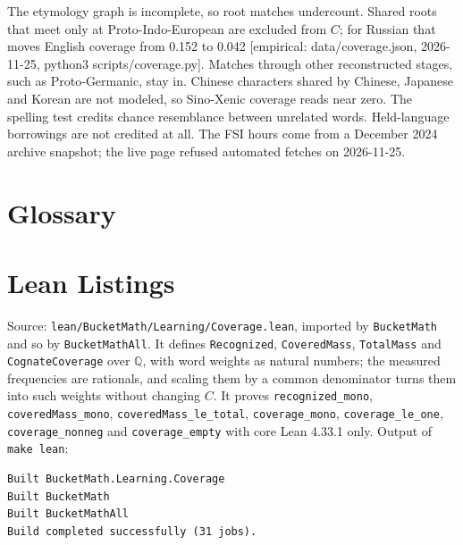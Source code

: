 \documentclass[11pt]{article}
\newcommand{\emp}[1]{{\small[empirical: #1]}}
\newcommand{\covrun}{data/coverage.json, 2026-11-25, python3 scripts/coverage.py}
\begin{document}
The etymology graph is incomplete, so root matches undercount. Shared
roots that meet only at Proto-Indo-European are excluded from $C$; for
Russian that moves English coverage from 0.152 to 0.042 \emp{\covrun}.
Matches through other reconstructed stages, such as Proto-Germanic, stay
in. Chinese
characters shared by Chinese, Japanese and Korean are not modeled, so
Sino-Xenic coverage reads near zero. The spelling test credits chance
resemblance between unrelated words. Held-language borrowings are not
credited at all. The FSI hours come from a December 2024
archive snapshot; the live page refused automated fetches on 2026-11-25.

\printbibliography

\appendix

\section{Glossary}
\label{app:glossary}


\section{Lean Listings}
\label{app:lean}

Source: \texttt{lean/BucketMath/Learning/Coverage.lean}, imported by
\texttt{BucketMath} and so by \texttt{BucketMathAll}. It defines
\texttt{Recognized}, \texttt{CoveredMass}, \texttt{TotalMass} and
\texttt{CognateCoverage} over $\mathbb{Q}$, with word weights as natural
numbers; the measured frequencies are rationals, and scaling them by a
common denominator turns them into such weights without changing $C$. It proves
\texttt{recognized\_mono}, \texttt{coveredMass\_mono},
\texttt{coveredMass\_le\_total}, \texttt{coverage\_mono},
\texttt{coverage\_le\_one}, \texttt{coverage\_nonneg} and
\texttt{coverage\_empty} with core Lean 4.33.1 only. Output of
\texttt{make lean}:

\begin{verbatim}
Built BucketMath.Learning.Coverage
Built BucketMath
Built BucketMathAll
Build completed successfully (31 jobs).
\end{verbatim}
\end{document}
